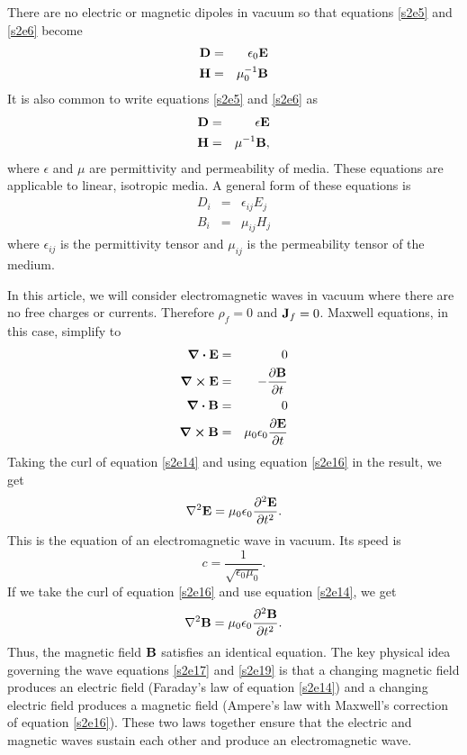 \documentclass[11pt]{article}
\numberwithin{equation}{section}
\begin{document}
There are no electric or magnetic dipoles in vacuum so that equations
\eqref{s2e5} and \eqref{s2e6} become
\begin{eqnarray}
\vb{D} &=& \epsilon_0\vb{E} \label{s2e7} \\
\vb{H} &=& \mu_0^{-1}\vb{B} \label{s2e8}
\end{eqnarray}
It is also common to write equations \eqref{s2e5} and \eqref{s2e6} as
\begin{eqnarray}
\vb{D} &=& \epsilon\vb{E} \label{s2e9} \\
\vb{H} &=& \mu^{-1}\vb{B}, \label{s2e10}
\end{eqnarray}
where $\epsilon$ and $\mu$ are permittivity and permeability of media. These
equations are applicable to linear, isotropic media. A general form of these
equations is
\begin{eqnarray}
D_i &=& \epsilon_{ij}E_j \label{s2e11} \\
B_i &=& \mu_{ij}H_j \label{s2e12}
\end{eqnarray}
where $\epsilon_{ij}$ is the permittivity tensor and $\mu_{ij}$ is the
permeability tensor of the medium. 

In this article, we will consider electromagnetic waves in vacuum where there 
are no free charges or currents. Therefore $\rho_f = 0$ and $\vb{J}_f= 0$.
Maxwell equations, in this case, simplify to
\begin{eqnarray}
\div\vb{E} &=& 0 \label{s2e13} \\
\curl\vb{E} &=& -\pdv{\vb{B}}{t} \label{s2e14} \\
\div\vb{B} &=& 0 \label{s2e15} \\
\curl\vb{B} &=& \mu_0\epsilon_0\pdv{\vb{E}}{t} \label{s2e16}
\end{eqnarray}
Taking the curl of equation \eqref{s2e14} and using equation \eqref{s2e16}
in the result, we get
\begin{equation}\label{s2e17}
\laplacian\vb{E} = \mu_0\epsilon_0\pdv[2]{\vb{E}}{t}.
\end{equation}
This is the equation of an electromagnetic wave in vacuum. Its speed is
\begin{equation}\label{s2e18}
c = \frac{1}{\sqrt{\epsilon_0\mu_0}}.
\end{equation}
If we take the curl of equation \eqref{s2e16} and use equation \eqref{s2e14},
we get
\begin{equation}\label{s2e19}
\laplacian\vb{B} = \mu_0\epsilon_0\pdv[2]{\vb{B}}{t}.
\end{equation}
Thus, the magnetic field $\vb{B}$ satisfies an identical equation. The key
physical idea governing the wave equations \eqref{s2e17} and \eqref{s2e19}
is that a changing magnetic field produces an electric field (Faraday's law
of equation \eqref{s2e14}) and a changing electric field produces a 
magnetic field (Ampere's law with Maxwell's correction of equation 
\eqref{s2e16}). These two laws together ensure that the electric and magnetic
waves sustain each other and produce an electromagnetic wave.
\end{document}
